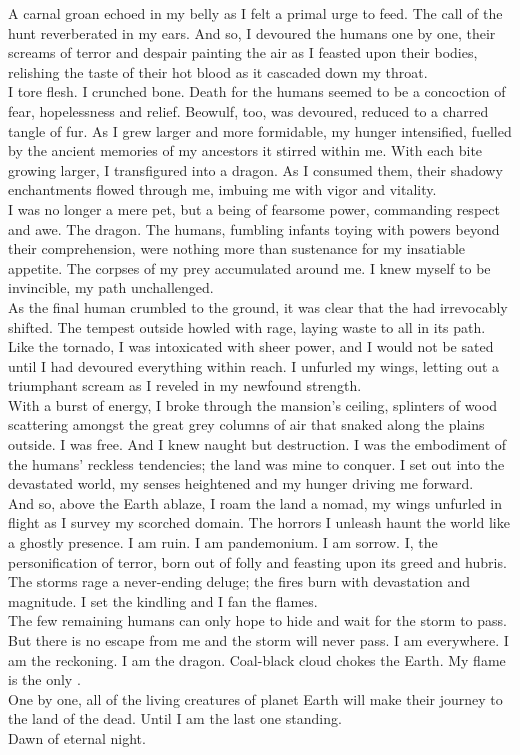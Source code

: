 A carnal groan echoed in my belly as I felt a primal urge to feed. The call of the hunt reverberated in my ears. And so, I devoured the humans one by one, their screams of terror and despair painting the air as I feasted upon their bodies, relishing the taste of their hot blood as it cascaded down my throat. \\
I tore flesh. I crunched bone. Death for the humans seemed to be a concoction of fear, hopelessness and relief. Beowulf, too, was devoured, reduced to a charred tangle of fur. As I grew larger and more formidable, my hunger intensified, fuelled by the ancient memories of my ancestors it stirred within me. With each bite growing larger, I transfigured into a dragon. As I consumed them, their shadowy enchantments flowed through me, imbuing me with vigor and vitality. \\
I was no longer a mere pet, but a being of fearsome power, commanding respect and awe. The dragon. The humans, fumbling infants toying with powers beyond their comprehension, were nothing more than sustenance for my insatiable appetite. The corpses of my prey accumulated around me. I knew myself to be invincible, my path unchallenged. \\

As the final human crumbled to the ground, it was clear that the  had irrevocably shifted. The tempest outside howled with rage, laying waste to all in its path. Like the tornado, I was intoxicated with sheer power, and I would not be sated until I had devoured everything within reach. I unfurled my wings, letting out a triumphant scream as I reveled in my newfound strength. \\
With a burst of energy, I broke through the mansion's ceiling, splinters of wood scattering amongst the great grey columns of air that snaked along the plains outside. I was free. And I knew naught but destruction. I was the embodiment of the humans' reckless tendencies; the land was mine to conquer. I set out into the devastated world, my senses heightened and my hunger driving me forward. \\

And so, above the Earth ablaze, I roam the land a nomad, my wings unfurled in flight as I survey my scorched domain. The horrors I unleash haunt the world like a ghostly presence. I am ruin. I am pandemonium. I am sorrow. I, the personification of terror, born out of  folly and feasting upon its greed and hubris. The storms rage a never-ending deluge; the fires burn with devastation and magnitude. I set the kindling and I fan the flames. \\
The few remaining humans can only hope to hide and wait for the storm to pass. But there is no escape from me and the storm will never pass. I am everywhere. I am the reckoning. I am the dragon. Coal-black cloud chokes the Earth. My flame is the only . \\
One by one, all of the living creatures of planet Earth will make their journey to the land of the dead. Until I am the last one standing. \\

Dawn of eternal night. \\
